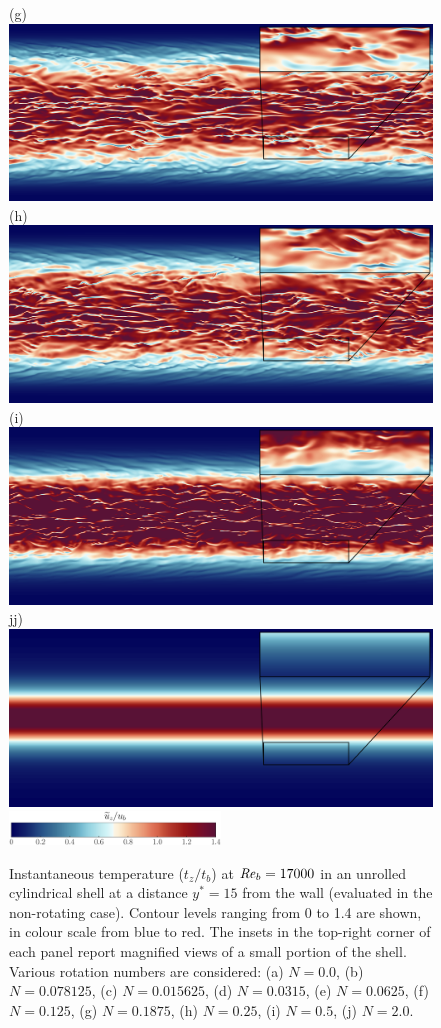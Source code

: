 \documentclass[lineno]{jfm}
\begin{document}
\begin{figure}
                (g) \includegraphics[width=6.cm]{Figures/unrolled_rotz0_roty0.1875_T.png} \\ 
                (h) \includegraphics[width=6.cm]{Figures/unrolled_rotz0_roty0.25_T.png} 
                (i) \includegraphics[width=6.cm]{Figures/unrolled_rotz0_roty0.5_T.png} \\
                jj) \includegraphics[width=6.cm]{Figures/unrolled_rotz0_roty1.0_T.png} 
		\\ \includegraphics[width=0.5\textwidth]{Figures/uz_cmap.eps}
		\caption{
			Instantaneous temperature ($t_z/t_b$) at $\mbox{\textit{Re}}_b = 17000$
			in an unrolled cylindrical shell at a distance
			$y^*=15$ from the wall (evaluated in the non-rotating case).
			Contour levels ranging from 0 to 1.4 are shown,
			in colour scale from blue to red. 
			The insets in the top-right corner of each panel report magnified views of a small portion of the shell.
			Various rotation numbers are considered:
                        (a) $N = 0.0$,
			(b) $N = 0.078125$,
                        (c) $N = 0.015625$,
                        (d) $N = 0.0315$,
                        (e) $N = 0.0625$,
                        (f) $N = 0.125$,
			(g) $N = 0.1875$,
                        (h) $N = 0.25$,
                        (i) $N = 0.5$,
                        (j) $N = 2.0$.
		    }
			\label{fig:ttz_3000} 
	\end{figure}
	 
\end{document}
